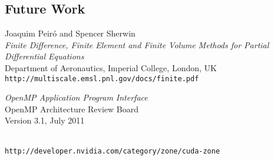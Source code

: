 \documentclass[9pt,twocolumn]{scrartcl}
\begin{document}
\subsection{Future Work}



\begin{thebibliography}{12345}

	Joaquim Peiró and Spencer Sherwin	\\
	\textit{Finite Difference, Finite Element and Finite Volume Methods for Partial Differential Equations}	\\
	Department of Aeronautics, Imperial College, London, UK	\\
	\texttt{\smaller http://multiscale.emsl.pnl.gov/docs/finite.pdf}

	\textit{OpenMP Application Program Interface}	\\
	OpenMP Architecture Review Board	\\
	Version 3.1, July 2011

	\hfill\\
	\texttt{\smaller http://developer.nvidia.com/category/zone/cuda-zone}

\end{thebibliography}
\end{document}
